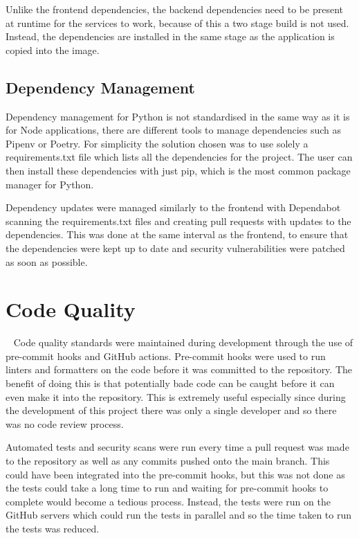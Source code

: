 Unlike the frontend dependencies, the backend dependencies need to be present at runtime for the services to work, because of this a two stage build is not used. Instead, the dependencies are installed in the same stage as the application is copied into the image.

\subsection{Dependency Management}
Dependency management for Python is not standardised in the same way as it is for Node applications, there are different tools to manage dependencies such as Pipenv or Poetry. For simplicity the solution chosen was to use solely a requirements.txt file which lists all the dependencies for the project. The user can then install these dependencies with just pip, which is the most common package manager for Python.

Dependency updates were managed similarly to the frontend with Dependabot scanning the requirements.txt files and creating pull requests with updates to the dependencies. This was done at the same interval as the frontend, to ensure that the dependencies were kept up to date and security vulnerabilities were patched as soon as possible.

\section{Code Quality}~\label{sec:code-quality}
Code quality standards were maintained during development through the use of pre-commit hooks and GitHub actions. Pre-commit hooks were used to run linters and formatters on the code before it was committed to the repository. The benefit of doing this is that potentially bade code can be caught before it can even make it into the repository. This is extremely useful especially since during the development of this project there was only a single developer and so there was no code review process.

Automated tests and security scans were run every time a pull request was made to the repository as well as any commits pushed onto the main branch. This could have been integrated into the pre-commit hooks, but this was not done as the tests could take a long time to run and waiting for pre-commit hooks to complete would become a tedious process. Instead, the tests were run on the GitHub servers which could run the tests in parallel and so the time taken to run the tests was reduced.
